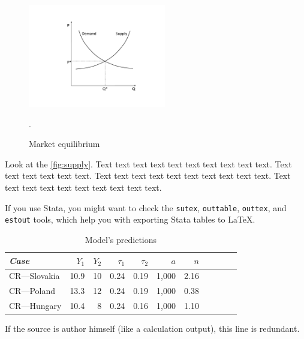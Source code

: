 \begin{figure}[!htbp]
\begin{center}
\caption{Market equilibrium}
\label{fig:supply}
\includegraphics[width=60mm]{Figures/supplydemand}
\end{center}\vspace{-0.5cm}
\begin{source}\cite{Haufler2006}.\end{source}
\end{figure}

Look at the \autoref{fig:supply}. Text text text text text text text text text text. Text text text text text text. Text text text text text text text text text text. Text text text text text text text text text text.





If you use Stata, you might want to check the \texttt{sutex}, \texttt{outtable}, \texttt{outtex}, and \texttt{estout} tools, which help you with exporting Stata tables to \LaTeX{}.


\begin{table}[!htbp]
\begin{center}
	\caption[Calibration table]{Model's predictions}\label{tab:values}
\begin{tabular}{lrrrrrrrrrr}
\toprule
\textit{Case} &        $Y_1$ &        $Y_2$ &  $\tau_1$ &  $\tau_2$ &          $a$ &          $n$\\
\midrule
CR---Slovakia &       10.9 &         10 &       0.24 &       0.19 &          1,000 &       2.16\\

CR---Poland &       13.3 &         12 &       0.24 &       0.19 &          1,000 &       0.38\\

CR---Hungary &       10.4 &          8 &       0.24 &       0.16 &          1,000 &        1.10\\
\bottomrule
\end{tabular}  
\end{center}
\begin{source} If the source is author himself (like a calculation output), this line is redundant.\end{source}
\end{table}

